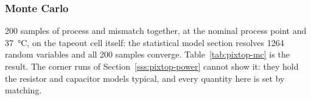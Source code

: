 %

\subsubsection{Monte Carlo}\label{sss:pixtop-mc}

200 samples of process and mismatch together, at the nominal process point and
\SI{37}{\celsius}, on the tapeout cell itself: the statistical model section
resolves \num{1264} random variables and all 200 samples converge.
Table~\ref{tab:pixtop-mc} is the result. The corner runs of
Section~\ref{sss:pixtop-power} cannot show it: they hold the resistor and
capacitor models typical, and every quantity here is set by matching.

